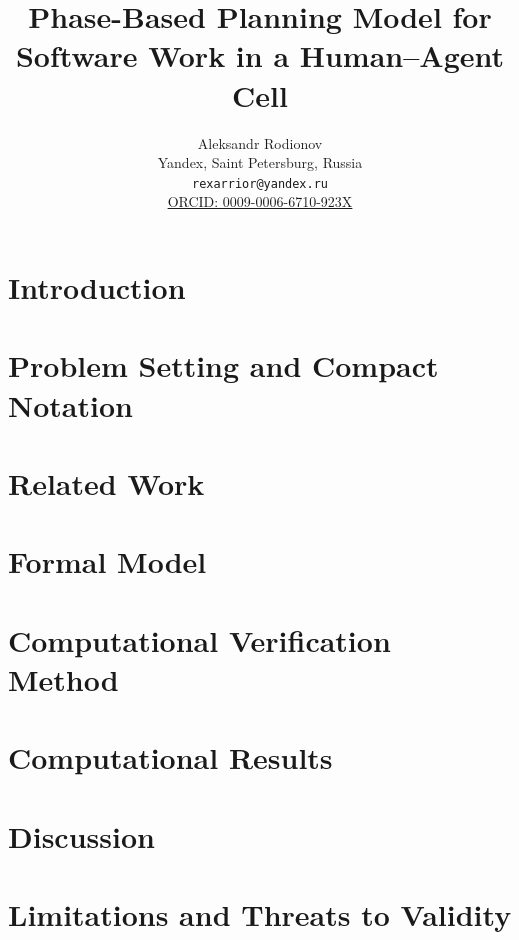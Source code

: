 \documentclass[12pt,a4paper]{article}
\title{Phase-Based Planning Model for Software Work in a Human--Agent Cell}
\author{Aleksandr Rodionov\\
Yandex, Saint Petersburg, Russia\\
\texttt{rexarrior@yandex.ru}\\
\href{https://orcid.org/0009-0006-6710-923X}{ORCID: 0009-0006-6710-923X}}
\date{}
\theoremstyle{definition}
\begin{document}
\maketitle

\begin{abstract}

\end{abstract}

\section{Introduction}


\section{Problem Setting and Compact Notation}


\section{Related Work}


\section{Formal Model}
\label{sec:formal-model}


\clearpage
\section{Computational Verification Method}


\section{Computational Results}
\label{sec:computational-results}


\section{Discussion}


\section{Limitations and Threats to Validity}

\end{document}
